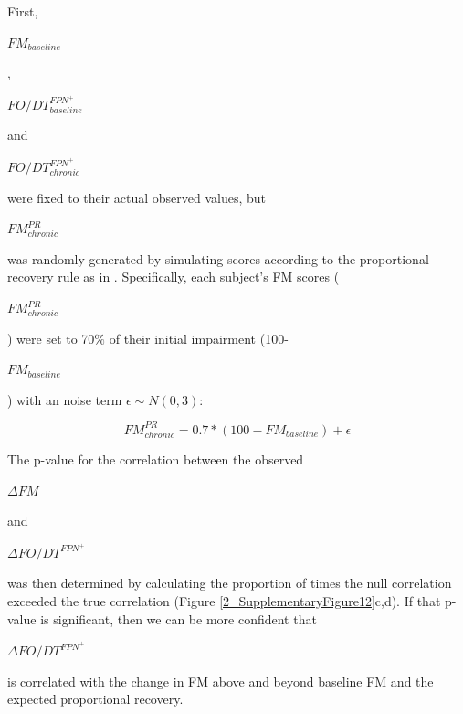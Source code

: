 \documentclass[phd,tocprelim]{cornell}
\begin{document}
     First, \begin{Large}$FM_{baseline}$\end{Large}, \begin{Large}$FO/DT^{FPN^+}_{baseline}$\end{Large}  and  \begin{Large}$FO/DT^{FPN^+}_{chronic}$\end{Large}  were fixed to their actual observed values, but  \begin{Large}$FM^{PR}_{chronic}$\end{Large}  was randomly generated by simulating scores according to the proportional recovery rule as in \cite{Kundert2019-ou}. Specifically, each subject's FM scores ( \begin{Large}$FM^{PR}_{chronic}$\end{Large} ) were set to 70$\%$ of their initial impairment (100- \begin{Large}$FM_{baseline}$\end{Large}) with an noise term $\epsilon \sim N(0,3)$:
   \begin{Large}
    \begin{equation}
        FM^{PR}_{chronic} = 0.7*(100-FM_{baseline}) + \epsilon
    \end{equation}
    \end{Large}
    The p-value for the correlation between the observed \begin{Large}$\Delta FM$\end{Large} and \begin{Large}$\Delta FO/DT^{FPN^+}$\end{Large} was then determined by calculating the proportion of times the null correlation exceeded the true correlation (Figure \ref{2_SupplementaryFigure12}c,d). If that p-value is significant, then we can be more confident that \begin{Large}$\Delta FO/DT^{FPN^+}$\end{Large} is correlated with the change in FM above and beyond baseline FM and the expected proportional recovery.
    
\end{document}
